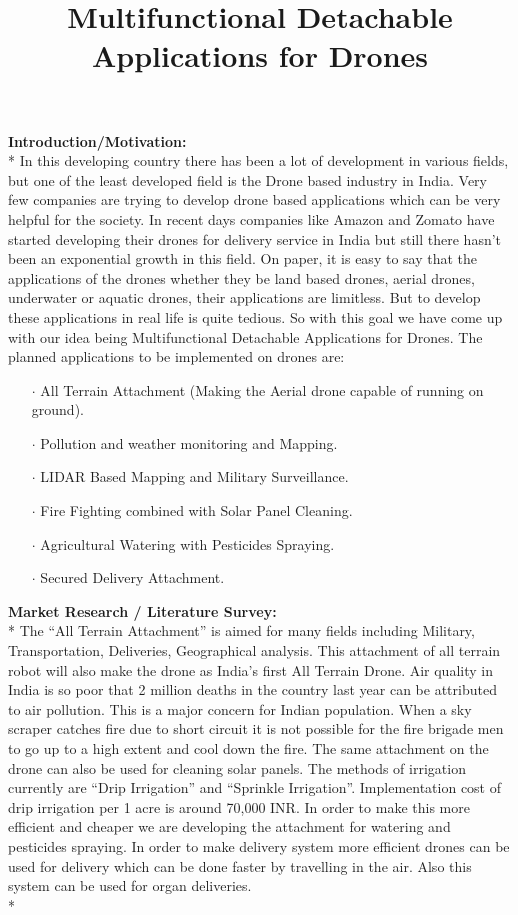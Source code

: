 \documentclass[12pt]{article}
\begin{document}
	\title{Multifunctional Detachable Applications for Drones}	
	\maketitle
	
\textbf{Introduction/Motivation:}\\*
In this developing country there has been a lot of development in various fields, but one of the least developed field is the Drone based industry in India. Very few companies are trying to develop drone based applications which can be very helpful for the society. In recent days companies like Amazon and Zomato have started developing their drones for delivery service in India but still there hasn’t been an exponential growth in this field. On paper, it is easy to say that the applications of the drones whether they be land based drones, aerial drones, underwater or aquatic drones, their applications are limitless. But to develop these applications in real life is quite tedious. So with this goal we have come up with our idea being Multifunctional Detachable Applications for Drones. The planned applications to be implemented on drones are:
\begin{itemize}
\item[$\cdot$] All Terrain Attachment (Making the Aerial drone capable of running on ground).
\item[$\cdot$] Pollution and weather monitoring and Mapping.
\item[$\cdot$] LIDAR Based Mapping and Military Surveillance.
\item[$\cdot$] Fire Fighting combined with Solar Panel Cleaning.
\item[$\cdot$] Agricultural Watering with Pesticides Spraying.
\item[$\cdot$] Secured Delivery Attachment.
\end{itemize}


\textbf{Market Research / Literature Survey:}\\*
The “All Terrain Attachment” is aimed for many fields including Military, Transportation, Deliveries, Geographical analysis. This attachment of all terrain robot will also make the drone as India’s first All Terrain Drone. 
Air quality in India is so poor that 2 million deaths in the country last year can be attributed to air pollution. This is a major concern for Indian population.
When a sky scraper catches fire due to short circuit it is not possible for the fire brigade men to go up to a high extent and cool down the fire. The same attachment on the drone can also be used for cleaning solar panels.
The methods of irrigation currently are “Drip Irrigation” and “Sprinkle Irrigation”. Implementation cost of drip irrigation per 1 acre is around 70,000 INR. In order to make this more efficient and cheaper we are developing the attachment for watering and pesticides spraying.
In order to make delivery system more efficient drones can be used for delivery which can be done faster by travelling in the air. Also this system can be used for organ deliveries. \\*
\end{document}
